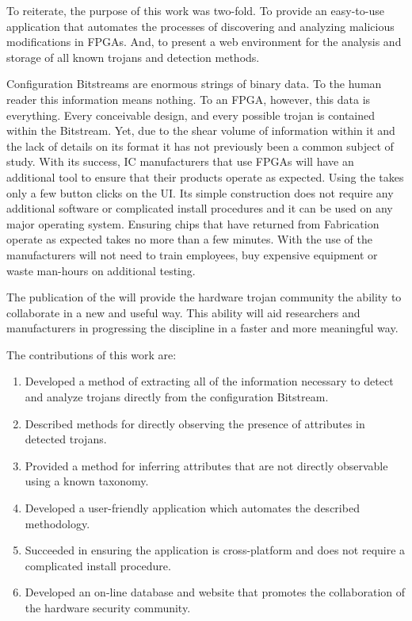 \label{concl}
To reiterate, the purpose of this work was two-fold.
To provide an easy-to-use application that automates the processes of discovering and analyzing malicious modifications in \acrshort{FPGA}s.
And, to present a web environment for the analysis and storage of all known trojans and detection methods.

Configuration \gls{Bitstream}s are enormous strings of binary data.
To the human reader this information means nothing.
To an \acrshort{FPGA}, however, this data is everything.
Every conceivable design, and every possible trojan is contained within the \gls{Bitstream}.
Yet, due to the shear volume of information within it and the lack of details on its format it has not previously been a common subject of study.
With its success, \acrlong{IC} manufacturers that use \acrshort{FPGA}s will have an additional tool to ensure that their products operate as expected.
Using the \NameNoPeriod takes only a few button clicks on the \acrlong{UI}.
Its simple construction does not require any additional software or complicated install procedures and it can be used on any major operating system.
Ensuring chips that have returned from Fabrication operate as expected takes no more than a few minutes.
With the use of the \NameNoPeriod manufacturers will not need to train employees, buy expensive equipment or waste man-hours on additional testing.

The publication of the \WebNameNoPeriod will provide the hardware trojan community the ability to collaborate in a new and useful way. 
This ability will aid researchers and manufacturers in progressing the discipline in a faster and more meaningful way.

The contributions of this work are:
\begin{enumerate}
	\item Developed a method of extracting all of the information necessary to detect and analyze trojans directly from the configuration \gls{Bitstream}. 
	\item Described methods for directly observing the presence of attributes in detected trojans.
	\item Provided a method for inferring attributes that are not directly observable using a known taxonomy.
	\item Developed a user-friendly application which automates the described methodology.
	\item Succeeded in ensuring the application is cross-platform and does not require a complicated install procedure.
	\item Developed an on-line database and website that promotes the collaboration of the hardware security community.
\end{enumerate}




